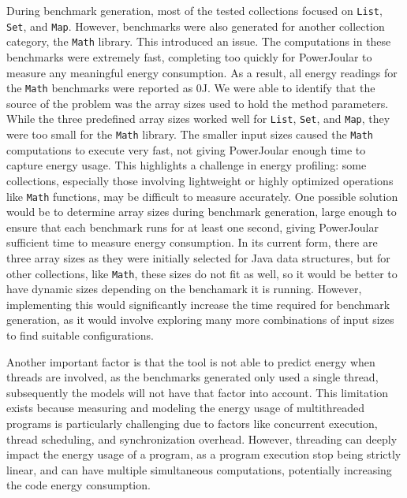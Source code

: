 During benchmark generation, most of the tested collections focused on \texttt{List}, \texttt{Set}, and \texttt{Map}. However, benchmarks were also generated for another collection category, the \texttt{Math} library. This introduced an issue. The computations in these benchmarks were extremely fast, completing too quickly for PowerJoular to measure any meaningful energy consumption. As a result, all energy readings for the \texttt{Math} benchmarks were reported as 0J.
We were able to identify that the source of the problem was the array sizes used to hold the method parameters. While the three predefined array sizes worked well for \texttt{List}, \texttt{Set}, and \texttt{Map}, they were too small for the \texttt{Math} library. The smaller input sizes caused the \texttt{Math} computations to execute very fast, not giving PowerJoular enough time to capture energy usage.
This highlights a challenge in energy profiling: some collections, especially those involving lightweight or highly optimized operations like \texttt{Math} functions, may be difficult to measure accurately. One possible solution would be to determine array sizes during benchmark generation, large enough to ensure that each benchmark runs for at least one second, giving PowerJoular sufficient time to measure energy consumption. In its current form, there are three array sizes as they were initially selected for Java data structures, but for other collections, like \texttt{Math}, these sizes do not fit as well, so it would be better to have dynamic sizes depending on the benchamark it is running. However, implementing this would significantly increase the time required for benchmark generation, as it would involve exploring many more combinations of input sizes to find suitable configurations. 



Another important factor is that the tool is not able to predict energy when threads are involved, as the benchmarks generated only used a single thread, subsequently the models will not have that factor into account. This limitation exists because measuring and modeling the energy usage of multithreaded programs is particularly challenging due to factors like concurrent execution, thread scheduling, and synchronization overhead. However, threading can deeply impact the energy usage of a program, as a program execution stop being strictly linear, and can have multiple simultaneous computations, potentially increasing the code energy consumption.


